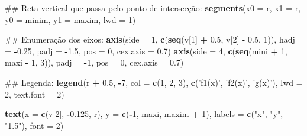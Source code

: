 \documentclass[]{book}
\newenvironment{Shaded}{\begin{snugshade}}{\end{snugshade}}
\newcommand{\KeywordTok}[1]{\textcolor[rgb]{0.13,0.29,0.53}{\textbf{#1}}}
\newcommand{\DataTypeTok}[1]{\textcolor[rgb]{0.13,0.29,0.53}{#1}}
\newcommand{\DecValTok}[1]{\textcolor[rgb]{0.00,0.00,0.81}{#1}}
\newcommand{\FloatTok}[1]{\textcolor[rgb]{0.00,0.00,0.81}{#1}}
\newcommand{\StringTok}[1]{\textcolor[rgb]{0.31,0.60,0.02}{#1}}
\newcommand{\OperatorTok}[1]{\textcolor[rgb]{0.81,0.36,0.00}{\textbf{#1}}}
\newcommand{\NormalTok}[1]{#1}
\begin{document}
\begin{enumerate}
\begin{Shaded}
\begin{Highlighting}[]
\NormalTok{##  Reta vertical que passa pelo ponto de intersecção:}
\KeywordTok{segments}\NormalTok{(}\DataTypeTok{x0 =}\NormalTok{ r, }\DataTypeTok{x1 =}\NormalTok{ r,}
     \DataTypeTok{y0 =}\NormalTok{ minim, }\DataTypeTok{y1 =}\NormalTok{ maxim, }\DataTypeTok{lwd =} \DecValTok{1}\NormalTok{)}

\NormalTok{##  Enumeração dos eixos:}
\KeywordTok{axis}\NormalTok{(}\DataTypeTok{side =} \DecValTok{1}\NormalTok{, }\KeywordTok{c}\NormalTok{(}\KeywordTok{seq}\NormalTok{(v[}\DecValTok{1}\NormalTok{] }\OperatorTok{+}\StringTok{ }\FloatTok{0.5}\NormalTok{, v[}\DecValTok{2}\NormalTok{] }\OperatorTok{-}\StringTok{ }\FloatTok{0.5}\NormalTok{, }\DecValTok{1}\NormalTok{)),}
 \DataTypeTok{hadj =} \OperatorTok{-}\FloatTok{0.25}\NormalTok{, }\DataTypeTok{padj =} \OperatorTok{-}\FloatTok{1.5}\NormalTok{, }\DataTypeTok{pos =} \DecValTok{0}\NormalTok{, }\DataTypeTok{cex.axis =} \FloatTok{0.7}\NormalTok{)}
\KeywordTok{axis}\NormalTok{(}\DataTypeTok{side =} \DecValTok{4}\NormalTok{, }\KeywordTok{c}\NormalTok{(}\KeywordTok{seq}\NormalTok{(mini }\OperatorTok{+}\StringTok{ }\DecValTok{1}\NormalTok{, maxi }\OperatorTok{-}\StringTok{ }\DecValTok{1}\NormalTok{, }\DecValTok{3}\NormalTok{)),}
 \DataTypeTok{padj =} \OperatorTok{-}\DecValTok{1}\NormalTok{, }\DataTypeTok{pos =} \DecValTok{0}\NormalTok{, }\DataTypeTok{cex.axis =} \FloatTok{0.7}\NormalTok{)}

\NormalTok{##  Legenda:}
\KeywordTok{legend}\NormalTok{(r }\OperatorTok{+}\StringTok{ }\FloatTok{0.5}\NormalTok{, }\OperatorTok{-}\DecValTok{7}\NormalTok{, }\DataTypeTok{col =} \KeywordTok{c}\NormalTok{(}\DecValTok{1}\NormalTok{, }\DecValTok{2}\NormalTok{, }\DecValTok{3}\NormalTok{), }\KeywordTok{c}\NormalTok{(}\StringTok{'f1(x)'}\NormalTok{, }\StringTok{'f2(x)'}\NormalTok{, }\StringTok{'g(x)'}\NormalTok{),}
   \DataTypeTok{lwd =} \DecValTok{2}\NormalTok{, }\DataTypeTok{text.font =} \DecValTok{2}\NormalTok{)}

\KeywordTok{text}\NormalTok{(}\DataTypeTok{x =} \KeywordTok{c}\NormalTok{(v[}\DecValTok{2}\NormalTok{], }\OperatorTok{-}\FloatTok{0.125}\NormalTok{, r), }\DataTypeTok{y =} \KeywordTok{c}\NormalTok{(}\OperatorTok{-}\DecValTok{1}\NormalTok{, maxi, maxim }\OperatorTok{+}\StringTok{ }\DecValTok{1}\NormalTok{),}
 \DataTypeTok{labels =} \KeywordTok{c}\NormalTok{(}\StringTok{"x"}\NormalTok{, }\StringTok{"y"}\NormalTok{, }\StringTok{"1.5"}\NormalTok{), }\DataTypeTok{font =} \DecValTok{2}\NormalTok{)}
\end{Highlighting}
\end{Shaded}


\end{enumerate}
\end{document}
